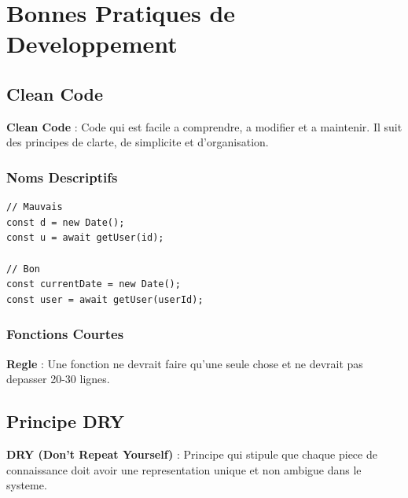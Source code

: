 \documentclass[a4paper,12pt]{book}
\begin{document}
\chapter{Bonnes Pratiques de Developpement}

\section{Clean Code}

\begin{definitionbox}
    \textbf{Clean Code} : Code qui est facile a comprendre, a modifier et a maintenir. Il suit des principes de clarte, de simplicite et d'organisation.
\end{definitionbox}

\subsection{Noms Descriptifs}

\begin{lstlisting}[style=javascript, caption=Mauvais vs Bon nommage]
// Mauvais
const d = new Date();
const u = await getUser(id);

// Bon
const currentDate = new Date();
const user = await getUser(userId);
\end{lstlisting}

\subsection{Fonctions Courtes}

\begin{bestpracticebox}
    \textbf{Regle} : Une fonction ne devrait faire qu'une seule chose et ne devrait pas depasser 20-30 lignes.
\end{bestpracticebox}

\section{Principe DRY}

\begin{definitionbox}
    \textbf{DRY (Don't Repeat Yourself)} : Principe qui stipule que chaque piece de connaissance doit avoir une representation unique et non ambigue dans le systeme.
\end{definitionbox}
\end{document}
